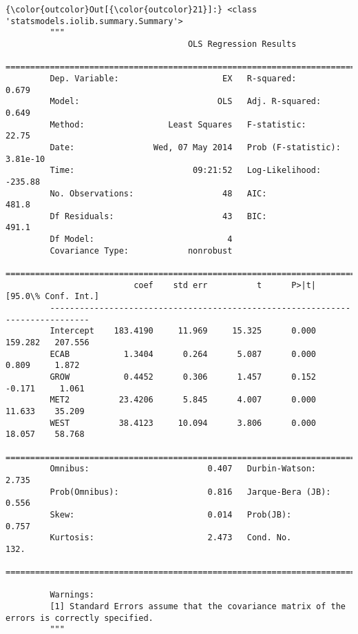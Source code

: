 \documentclass{article}
\begin{document}
            \begin{Verbatim}[commandchars=\\\{\}]
{\color{outcolor}Out[{\color{outcolor}21}]:} <class 'statsmodels.iolib.summary.Summary'>
         """
                                     OLS Regression Results                            
         ==============================================================================
         Dep. Variable:                     EX   R-squared:                       0.679
         Model:                            OLS   Adj. R-squared:                  0.649
         Method:                 Least Squares   F-statistic:                     22.75
         Date:                Wed, 07 May 2014   Prob (F-statistic):           3.81e-10
         Time:                        09:21:52   Log-Likelihood:                -235.88
         No. Observations:                  48   AIC:                             481.8
         Df Residuals:                      43   BIC:                             491.1
         Df Model:                           4                                         
         Covariance Type:            nonrobust                                         
         ==============================================================================
                          coef    std err          t      P>|t|      [95.0\% Conf. Int.]
         ------------------------------------------------------------------------------
         Intercept    183.4190     11.969     15.325      0.000       159.282   207.556
         ECAB           1.3404      0.264      5.087      0.000         0.809     1.872
         GROW           0.4452      0.306      1.457      0.152        -0.171     1.061
         MET2          23.4206      5.845      4.007      0.000        11.633    35.209
         WEST          38.4123     10.094      3.806      0.000        18.057    58.768
         ==============================================================================
         Omnibus:                        0.407   Durbin-Watson:                   2.735
         Prob(Omnibus):                  0.816   Jarque-Bera (JB):                0.556
         Skew:                           0.014   Prob(JB):                        0.757
         Kurtosis:                       2.473   Cond. No.                         132.
         ==============================================================================
         
         Warnings:
         [1] Standard Errors assume that the covariance matrix of the errors is correctly specified.
         """
\end{Verbatim}
        
\end{document}

